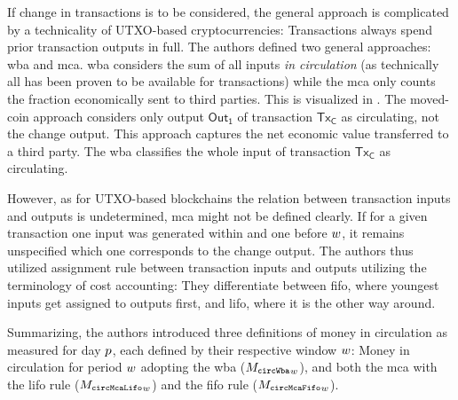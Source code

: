 If change in transactions is to be considered, the general approach is complicated by a technicality of UTXO-based cryptocurrencies: Transactions always spend prior transaction outputs in full. %
The authors defined two general approaches: \ac{wba} and \ac{mca}.  %
\ac{wba} considers the sum of all inputs \textit{in circulation} (as technically all has been proven to be available for transactions) while the \ac{mca} only counts the fraction economically sent to third parties.  %
%
This is visualized in .  %
The moved-coin approach considers only output $\mathsf{Out_1}$ of transaction $\mathsf{Tx_C}$ as circulating, not the change output.  %
This approach captures the net economic value transferred to a third party.  %
The \ac{wba} classifies the whole input of transaction $\mathsf{Tx_C}$ as circulating.  %

However, as for UTXO-based blockchains the relation between transaction inputs and outputs is undetermined, \ac{mca} might not be defined clearly. %
If for a given transaction one input was generated within and one before ${w}$, it remains unspecified which one corresponds to the change output.  %
The authors thus utilized assignment rule between transaction inputs and outputs utilizing the terminology of cost accounting: %
They differentiate between \ac{fifo}, where youngest inputs get assigned to outputs first, and \ac{lifo}, where it is the other way around.  %

Summarizing, the authors introduced three definitions of money in circulation as measured for day \({p}\), each defined by their respective window \({w}\): %
Money in circulation for period ${w}$ adopting the \ac{wba} ($ {{M_{\mathtt{circWba}}}_{w}} $), and both the \ac{mca} with the \ac{lifo} rule ($ {{M_{\mathtt{circMcaLifo}}}_{w}} $) and the \ac{fifo} rule ($ {{M_{\mathtt{circMcaFifo}}}_{w}} $).

